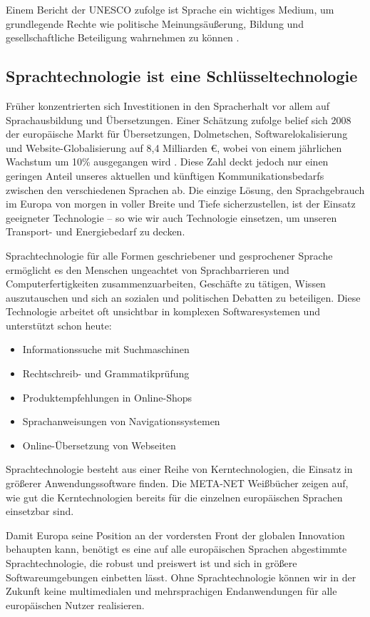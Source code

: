 \documentclass[]{../../metanetpaper}
\begin{document}
\begin{multicols}{2}

Einem Bericht der UNESCO zufolge ist Sprache ein wichtiges Medium, um grundlegende Rechte wie politische Meinungsäußerung, Bildung und gesellschaftliche Beteiligung wahrnehmen zu können \cite{Unesco1}.

\subsection{Sprachtechnologie ist eine Schlüsseltechnologie}

Früher konzentrierten sich Investitionen in den Spracherhalt vor allem auf Sprachausbildung und Übersetzungen. Einer Schätzung zufolge belief sich 2008 der europäische Markt für Übersetzungen, Dolmetschen, Softwarelokalisierung und Website-Globalisierung auf 8,4 Milliarden €, wobei von einem jährlichen Wachstum um 10\% ausgegangen wird \cite{EC3}. Diese Zahl deckt jedoch nur einen geringen Anteil unseres aktuellen und künftigen Kommunikationsbedarfs zwischen den verschiedenen Sprachen ab. Die einzige Lösung, den Sprachgebrauch im Europa von morgen in voller Breite und  Tiefe sicherzustellen, ist der Einsatz geeigneter Tech\-no\-lo\-gie -- so wie wir auch Technologie einsetzen, um  unseren Transport- und Energiebedarf zu decken.

Sprachtechnologie für alle Formen geschriebener und gesprochener Sprache ermöglicht es den Menschen ungeachtet von Sprachbarrieren und Computerfertigkeiten zusammenzuarbeiten, Geschäfte zu tätigen, Wissen auszutauschen und sich an sozialen und politischen Debatten zu beteiligen. Diese Technologie arbeitet oft unsichtbar in komplexen Softwaresystemen und unterstützt schon heute:

\begin{itemize}
\item Informationssuche mit Suchmaschinen
\item Rechtschreib- und Grammatikprüfung
\item Produktempfehlungen in Online-Shops
\item Sprachanweisungen von Na\-vi\-ga\-tions\-sys\-te\-men
\item Online-Übersetzung von Webseiten 
\end{itemize}

Sprachtechnologie besteht aus einer Reihe von Kerntechnologien, die Einsatz in größerer Anwendungssoftware finden. Die META-NET Weißbücher zeigen auf, wie gut die Kerntechnologien bereits für die einzelnen europäischen Sprachen einsetzbar sind. 


Damit Europa seine Position an der vordersten Front der globalen Innovation behaupten kann, benötigt es eine auf alle europäischen Sprachen abgestimmte Sprachtechnologie, die robust und preiswert ist und sich in größere Softwareumgebungen einbetten lässt. Ohne Sprachtechnologie können wir in der Zukunft keine multimedialen und mehrsprachigen Endanwendungen für alle europäischen Nutzer realisieren.
\end{multicols}
\end{document}
